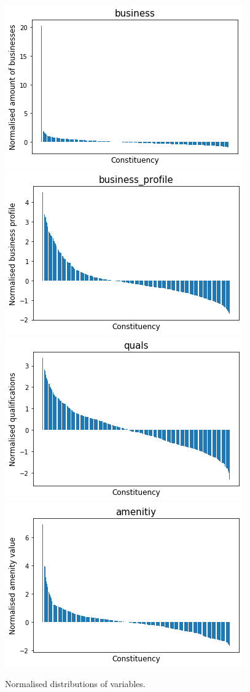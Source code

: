 \documentclass[a4paper, 11pt]{article}
\begin{document}
\begin{figure}
\includegraphics[scale=.43]{../gfx/business.png}
\includegraphics[scale=.43]{../gfx/business_profile.png}\\
\includegraphics[scale=.43]{../gfx/quals.png}
\includegraphics[scale=.43]{../gfx/amenity.png}
\caption{Normalised distributions of variables.}
\end{figure}
\end{document}
